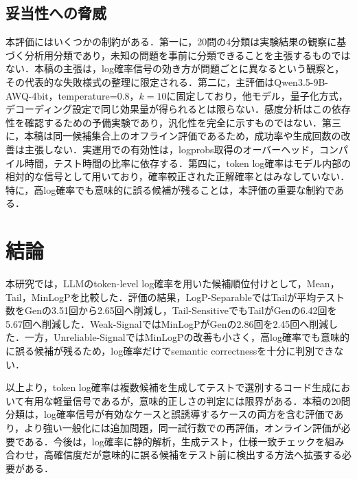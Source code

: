 \documentclass[submit,techrep,noauthor]{ipsj}
\begin{document}
\subsection{妥当性への脅威}

本評価にはいくつかの制約がある．第一に，20問の4分類は実験結果の観察に基づく分析用分類であり，未知の問題を事前に分類できることを主張するものではない．本稿の主張は，log確率信号の効き方が問題ごとに異なるという観察と，その代表的な失敗様式の整理に限定される．第二に，主評価はQwen3.5-9B-AWQ-4bit，temperature=0.8，$k=10$に固定しており，他モデル，量子化方式，デコーディング設定で同じ効果量が得られるとは限らない．感度分析はこの依存性を確認するための予備実験であり，汎化性を完全に示すものではない．第三に，本稿は同一候補集合上のオフライン評価であるため，成功率や生成回数の改善は主張しない．実運用での有効性は，logprobs取得のオーバーヘッド，コンパイル時間，テスト時間の比率に依存する．第四に，token log確率はモデル内部の相対的な信号として用いており，確率較正された正解確率とはみなしていない．特に，高log確率でも意味的に誤る候補が残ることは，本評価の重要な制約である．

\normalsize
 \section{結論}

本研究では，LLMのtoken-level log確率を用いた候補順位付けとして，Mean，Tail，MinLogPを比較した．評価の結果，LogP-SeparableではTailが平均テスト数をGenの3.51回から2.65回へ削減し，Tail-SensitiveでもTailがGenの6.42回を5.67回へ削減した．Weak-SignalではMinLogPがGenの2.86回を2.45回へ削減した．一方，Unreliable-SignalではMinLogPの改善も小さく，高log確率でも意味的に誤る候補が残るため，log確率だけでsemantic correctnessを十分に判別できない．

以上より，token log確率は複数候補を生成してテストで選別するコード生成において有用な軽量信号であるが，意味的正しさの判定には限界がある．本稿の20問分類は，log確率信号が有効なケースと誤誘導するケースの両方を含む評価であり，より強い一般化には追加問題，同一試行数での再評価，オンライン評価が必要である．今後は，log確率に静的解析，生成テスト，仕様一致チェックを組み合わせ，高確信度だが意味的に誤る候補をテスト前に検出する方法へ拡張する必要がある．



\end{document}
